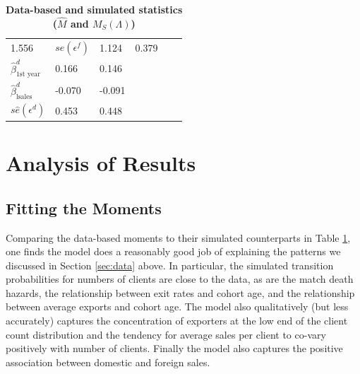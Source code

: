 \documentclass[12pt,titlepage]{article}
\begin{document}
\begin{table}
{\begin{tabular}{llllll}
{        1.556}                                                                         & $s\widehat{e}(\epsilon ^{f})$                  & {1.124}       &
        {0.379} \\
        $\widehat{\beta }_{\mbox{1st year}}^{d}$                                       & {0.166}                                        &
        {0.146}                                                                        &                                                &               & \\
        $\widehat{\beta }_{\mbox{lsales}}^{d}$                                         & {-0.070}                                       &
        {-0.091}                                                                       &                                                &               & \\
        $s\widehat{e}(\epsilon ^{d})$                                                  & {0.453}                                        &
        {0.448}                                                                        &                                                &               & \\ \hline
        \end{tabular}%
    }
\caption{\textbf{Data-based and simulated statistics ($\widehat{M}$ and $M_{S}(\Lambda)$)}}
\label{tab:est_results}
\end{table}
\pagebreak

\section{Analysis of Results}

\subsection{Fitting the Moments}

Comparing the data-based moments to their simulated counterparts in Table \ref{tab:est_results},
one finds the model does a reasonably good job of explaining the patterns we
discussed in Section \ref{sec:data} above. In particular, the simulated transition
probabilities for numbers of clients are close to the data, as are the match
death hazards, the relationship between exit rates and cohort age, and the
relationship between average exports and cohort age. The model also
qualitatively (but less accurately) captures the concentration of exporters
at the low end of the client count distribution and the tendency for average
sales per client to co-vary positively with number of clients. Finally the
model also captures the positive association between domestic and foreign
sales.
\end{document}
